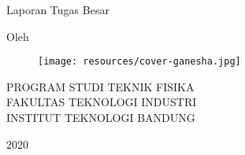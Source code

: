 \clearpage
\pagestyle{empty}

\begin{center}
\smallskip

    \Large \bfseries \MakeUppercase{\thetitle}
    \vfill

    \Large Laporan Tugas Besar
    \vfill


    \large Oleh

    \Large \theauthor

    \vfill
    \begin{figure}[h]
        \centering
      	\texttt{[image: resources/cover-ganesha.jpg]}
    \end{figure}
    \vfill

    \large
    \uppercase{
        Program Studi Teknik Fisika \\
        Fakultas Teknologi Industri \\
        Institut Teknologi Bandung
    }

    2020

\end{center}

\clearpage
